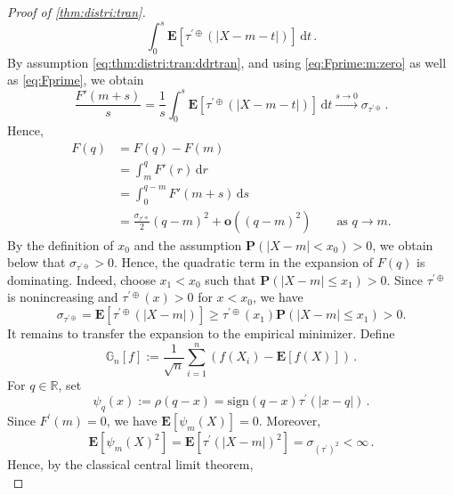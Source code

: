 \documentclass{article}
\newcommand*{\mo}[1]{\mathbf{#1}}
\newcommand{\R}{\mathbb{R}}
\newcommand{\lab}{\left[} %
\newcommand{\rab}{\right]} %
\newcommand{\ab}[1]{\lab #1 \rab} %
\newcommand{\abOf}[1]{\!\ab{#1}} %
\newcommand{\lb}{\left(} %
\newcommand{\rb}{\right)} %
\newcommand{\br}[1]{\lb #1 \rb} %
\newcommand{\brOf}[1]{\!\br{#1}} %
\renewcommand{\Pr}{\mathbf{P}} %
\newcommand{\Prof}[1]{\Pr(#1)}
\newcommand{\E}{\mathbf{E}} %
\newcommand{\Eof}[1]{\E[#1]}
\newcommand{\EOf}[1]{\E\abOf{#1}}
\newcommand{\pr}{^\prime}
\newcommand{\eqfs}{\,.}
\newcommand{\dl}{\mathrm{d}} %
\newcommand{\dtran}{\tau\pr}
\newcommand{\ddrtran}{\tau^{\prime\oplus}}
\newcommand{\sign}{\mathrm{sign}}
\begin{document}
\begin{proof}[Proof of \cref{thm:distri:tran}]
\begin{equation}
        \int_0^s
        \Eof{\ddrtran(|X-m-t|)}
        \,\dl t
        \eqfs
    \end{equation}
    By assumption \eqref{eq:thm:distri:tran:ddrtran}, and using \eqref{eq:Fprime:m:zero} as well as \eqref{eq:Fprime}, we obtain 
    \begin{equation}
        \frac{F'(m+s)}{s}
        =
        \frac1s\int_0^s \Eof{\ddrtran(|X-m-t|)} \,\dl t
        \xrightarrow{s \to 0}
        \sigma_{\ddrtran}
        \eqfs
    \end{equation}
    Hence,
    \begin{align}
        F(q)
        &=
        F(q)-F(m)
        \\&=
        \int_m^q F'(r)\,\dl r
        \\&=
        \int_0^{q-m} F'(m+s) \,\dl s
        \\&=
        \frac{\sigma_{\ddrtran}}2(q-m)^2
        +
        \mo o\brOf{(q-m)^2}
        \qquad
        \text{as }q\to m.
        \label{eq:F:expansion}
    \end{align}    
    By the definition of $x_0$ and the assumption $\Prof{|X-m|<x_0}>0$, we obtain below that $\sigma_{\ddrtran}>0$. Hence, the quadratic term in the expansion of $F(q)$ is dominating. 
    Indeed, choose $x_1<x_0$ such that $\Prof{|X-m|\le x_1}>0$. Since $\ddrtran$ is nonincreasing and $\ddrtran(x)>0$ for $x<x_0$, we have
    \begin{equation}
        \sigma_{\ddrtran}
        =
        \Eof{\ddrtran(|X-m|)}
        \geq
        \ddrtran(x_1)\Prof{|X-m|\le x_1}
        >
        0.
    \end{equation}
    It remains to transfer the expansion to the empirical minimizer. Define
    \begin{equation}
        \mathbb G_n [f]
        :=
        \frac1{\sqrt n}\sum_{i=1}^n
        \br{f(X_i)-\Eof{f(X)}}
        \eqfs
    \end{equation}
    For $q\in\R$, set
    \begin{equation}
        \psi_q(x) := \rho(q-x) = \sign(q-x)\dtran(|x-q|)
        \eqfs
    \end{equation}
    Since $F\pr(m)=0$, we have $\Eof{\psi_m(X)}=0$. Moreover,
    \begin{equation}
        \EOf{\psi_m(X)^2}
        =
        \EOf{\dtran(|X-m|)^2}
        =
        \sigma_{(\dtran)^2}
        <
        \infty
        \eqfs
    \end{equation}
    Hence, by the classical central limit theorem,
    \begin{equation}

\end{equation}
\end{proof}
\end{document}
